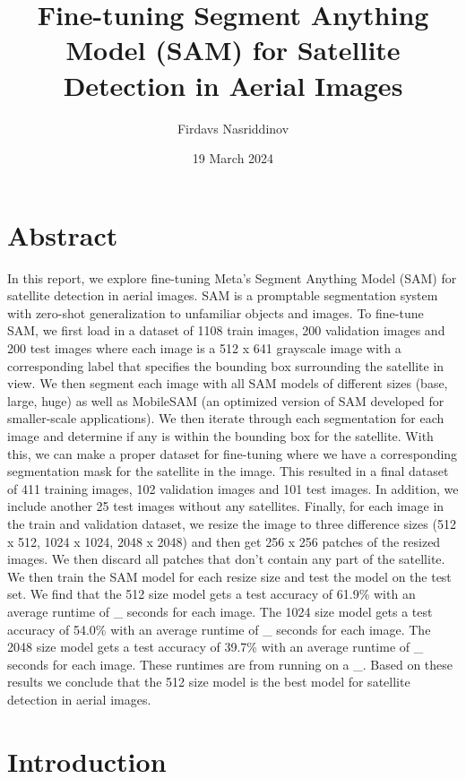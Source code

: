 \documentclass{article}
\title{Fine-tuning Segment Anything Model (SAM) for Satellite Detection in Aerial Images}
\author{Firdavs Nasriddinov}
\date{19 March 2024}
\begin{document}
\maketitle{}

\section*{Abstract}

In this report, we explore fine-tuning Meta's Segment Anything Model (SAM) for satellite detection in aerial images. SAM is a promptable segmentation system with zero-shot generalization to unfamiliar objects and images. To fine-tune SAM, we first load in a dataset of 1108 train images, 200 validation images and 200 test images where each image is a 512 x 641 grayscale image with a corresponding label that specifies the bounding box surrounding the satellite in view. We then segment each image with all SAM models of different sizes (base, large, huge) as well as MobileSAM (an optimized version of SAM developed for smaller-scale applications). We then iterate through each segmentation for each image and determine if any is within the bounding box for the satellite. With this, we can make a proper dataset for fine-tuning where we have a corresponding segmentation mask for the satellite in the image. This resulted in a final dataset of 411 training images, 102 validation images and 101 test images. In addition, we include another 25 test images without any satellites. Finally, for each image in the train and validation dataset, we resize the image to three difference sizes (512 x 512, 1024 x 1024, 2048 x 2048) and then get 256 x 256 patches of the resized images. We then discard all patches that don't contain any part of the satellite. We then train the SAM model for each resize size and test the model on the test set. We find that the 512 size model gets a test accuracy of 61.9\% with an average runtime of \_ seconds for each image. The 1024 size model gets a test accuracy of 54.0\% with an average runtime of \_ seconds for each image. The 2048 size model gets a test accuracy of 39.7\% with an average runtime of \_ seconds for each image. These runtimes are from running on a \_. Based on these results we conclude that the 512 size model is the best model for satellite detection in aerial images.

\medskip

\section*{Introduction}
\end{document}
